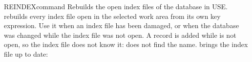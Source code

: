 \begin{XbaseEntry}{REINDEX}{command}
Rebuilds the open index files of the database in USE.
\Syntax
{}
\Usage
{} rebuilds every index file open in the selected work area from
its own key expression.  Use it when an index file has been damaged, or
when the database was changed while the index file was not open.
\Examples
A record is added while  is not open, so the index file
does not know it:  does not find the name.   brings
the index file up to date:
\end{XbaseEntry}

